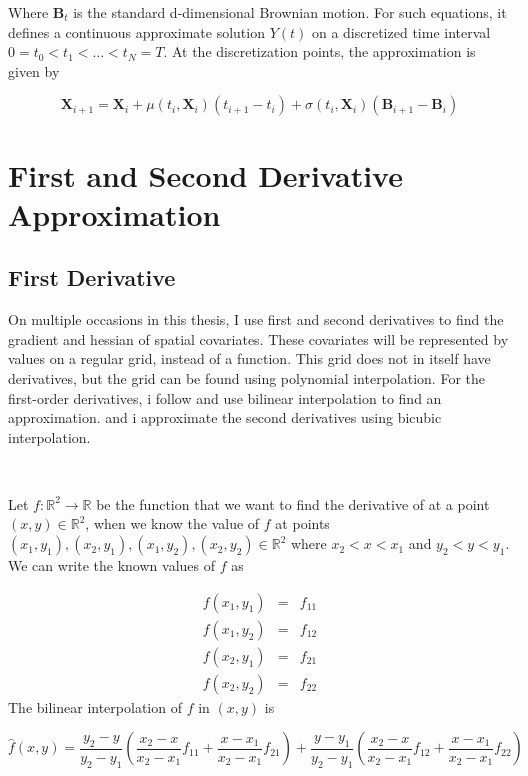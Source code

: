 Where $\textbf{B}_t$ is the standard d-dimensional Brownian motion. For such equations, it defines a continuous approximate solution $Y(t)$ on a discretized time interval $0=t_0 < t_1 < \dots < t_N = T$. At the discretization points, the approximation is given by

\begin{equation}
    \textbf{X}_{i+1} = \textbf{X}_i + \mu(t_i, \textbf{X}_i)(t_{i+1} - t_i) + \sigma(t_i, \textbf{X}_i)(\textbf{B}_{i+1} - \textbf{B}_i)
    \label{eq: euler approximation}
\end{equation}




\section{First and Second Derivative Approximation}
\subsection{First Derivative}
\label{subsec: gradient estimation}
On multiple occasions in this thesis, I use first and second derivatives to find the gradient and hessian of spatial covariates. These covariates will be represented by values on a regular grid, instead of a function. This grid does not in itself have derivatives, but the grid can be found using polynomial interpolation. For the first-order derivatives, i follow \parencite{michelot_langevin_2019} and use bilinear interpolation to find an approximation. and i approximate the second derivatives using bicubic interpolation. 

\

Let $f:\mathbb{R}^2\rightarrow \mathbb{R}$ be the function that we want to find the derivative of at a point $(x,y) \in \mathbb{R}^2$, when we know the value of $f$ at points $(x_1, y_1), (x_2, y_1), (x_1, y_2), (x_2, y_2) \in \mathbb{R}^2$ where $x_2 < x < x_1$ and $y_2 < y < y_1$. We can write the known values of $f$ as 


$$
\begin{array}{lcl}
     f(x_1, y_1)& = & f_{11}  \\
     f(x_1, y_2)& = & f_{12}  \\
     f(x_2, y_1)& = & f_{21}  \\
     f(x_2, y_2)& = & f_{22}  
\end{array}
$$
The bilinear interpolation of $f$ in $(x,y)$ is  

$$
\hat{f}(x,y) = \frac{y_2-y}{y_2-y_1}(\frac{x_2-x}{x_2-x_1}f_{11} + \frac{x-x_1}{x_2-x_1}f_{21}) + \frac{y-y_1}{y_2-y_1}(\frac{x_2-x}{x_2-x_1}f_{12} + \frac{x-x_1}{x_2-x_1}f_{22})
$$

